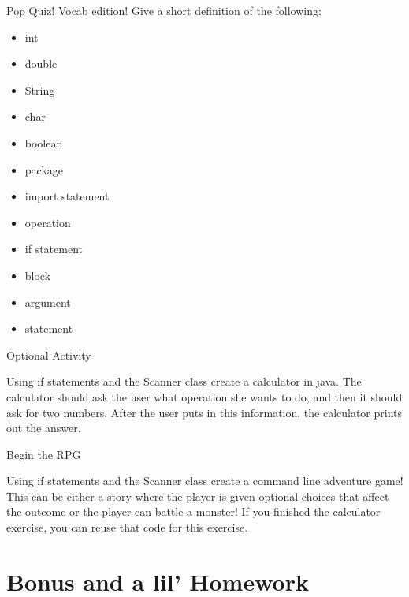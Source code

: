 \begin{frame}{Pop Quiz! Vocab edition!}
Give a short definition of the following:

\begin{itemize}
\item int \pause
\item double \pause
\item String \pause
\item char \pause
\item boolean \pause
\item package \pause
\item import statement \pause
\item operation \pause
\item if statement \pause
\item block \pause
\item argument \pause
\item statement
\end{itemize}

\end{frame}



\begin{frame}{Optional Activity}
\begin{center}
Using if statements and the Scanner class create a calculator in java. The calculator should ask the user what operation she wants to do, and then it should ask for two numbers. After the user puts in this information, the calculator prints out the answer.
\end{center}

\end{frame}

\begin{frame}{Begin the RPG}
\begin{center}
Using if statements and the Scanner class create a command line adventure game! This can be either a story where the player is given optional choices that affect the outcome or the player can battle a monster! If you finished the calculator exercise, you can reuse that code for this exercise.
\end{center}

\end{frame}



\section{Bonus and a lil' Homework}

